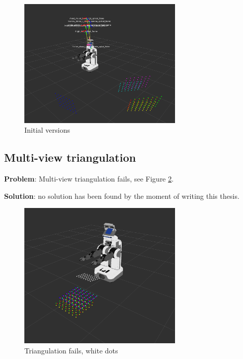 \begin{figure}[!htbp]
 \centering
 \includegraphics[width=0.7\textwidth]{images/screenshots/optimization_failer02_2.png}
 \caption{Initial versions}
 \label{fig:optimization_failer}
\end{figure}


\subsection{Multi-view triangulation}

\textbf{Problem}: Multi-view triangulation fails, see Figure \ref{fig:triangulation_fails}.

\noindent
\textbf{Solution}: no solution has been found by the moment of writing this thesis.

\begin{figure}[!htbp]
 \centering
 \includegraphics[width=0.7\textwidth]{images/screenshots/triangulation_fails.png}
 \caption{Triangulation fails, white dots}
 \label{fig:triangulation_fails}
\end{figure}




